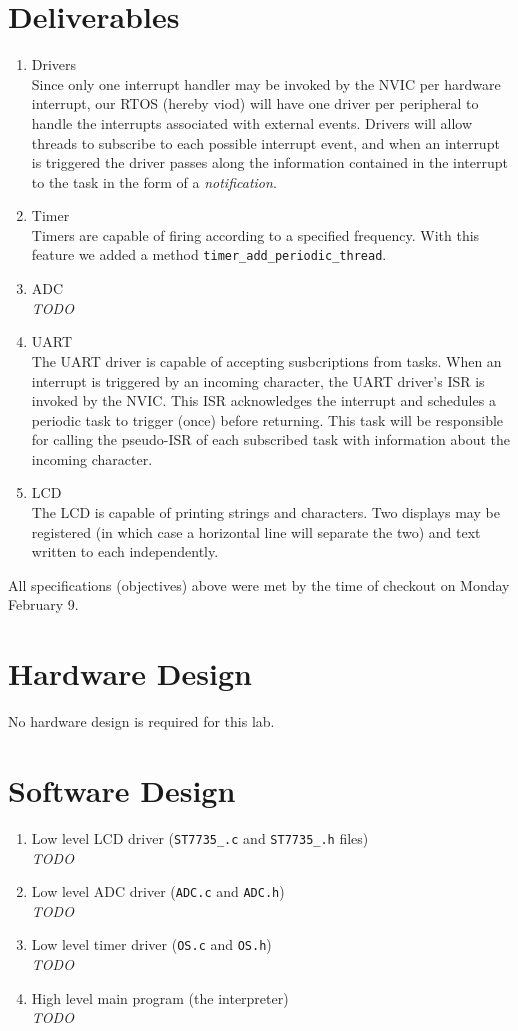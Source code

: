 \documentclass[12pt]{article}
\newcommand{\todo}{{\LARGE \emph{\color{red}TODO}}}
\begin{document}
\section{Deliverables}
\begin{enumerate}
\item Drivers \\
  Since only one interrupt handler may be invoked by the NVIC per
  hardware interrupt, our RTOS (hereby viod) will have one driver per
  peripheral to handle the interrupts associated with external
  events. Drivers will allow threads to subscribe to each possible
  interrupt event, and when an interrupt is triggered the driver
  passes along the information contained in the interrupt to the task
  in the form of a \emph{notification}.
\item Timer \\
  Timers are capable of firing according to a specified
  frequency. With this feature we added a method
  \verb|timer_add_periodic_thread|.
\item ADC \\

  \todo
\item UART \\
  The UART driver is capable of accepting susbcriptions from
  tasks. When an interrupt is triggered by an incoming character, the
  UART driver's ISR is invoked by the NVIC. This ISR acknowledges the
  interrupt and schedules a periodic task to trigger (once) before
  returning. This task will be responsible for calling the pseudo-ISR
  of each subscribed task with information about the incoming
  character.
\item LCD \\
  The LCD is capable of printing strings and characters. Two displays
  may be registered (in which case a horizontal line will separate the
  two) and text written to each independently.
\end{enumerate}
All specifications (objectives) above were met by the time of checkout
on Monday February 9.
\section{Hardware Design}
No hardware design is required for this lab.
\section{Software Design}
\begin{enumerate}[1)]
\item Low level LCD driver (\verb|ST7735_.c| and \verb|ST7735_.h|
  files) \\ \todo
\item Low level ADC driver (\verb|ADC.c| and \verb|ADC.h|) \\ \todo
\item Low level timer driver (\verb|OS.c| and \verb|OS.h|) \\ \todo
\item High level main program (the interpreter) \\ \todo
\end{enumerate}
\end{document}

